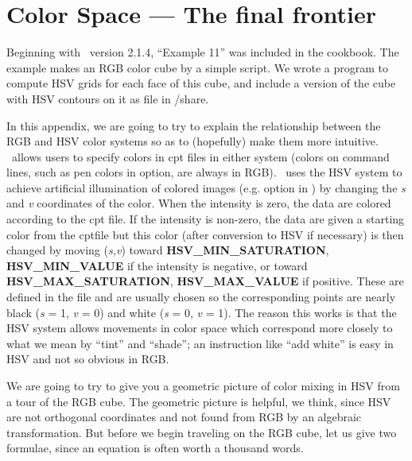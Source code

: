 %
%
\chapter{Color Space --- The final frontier}
\label{app:I}
\thispagestyle{headings}

Beginning with \GMT\ version 2.1.4, ``Example 11'' was included in
the cookbook.  The example makes an RGB color cube by a simple
 script.  We wrote a program to compute HSV grids for
each face of this cube, and include a version of the cube with
HSV contours on it as file  in /share.


In this appendix, we are going to try to explain the relationship
between the RGB and HSV color systems so as to (hopefully) make
them more intuitive.  \GMT\ allows users to specify colors in cpt
files in either system (colors on command lines, such as pen colors
in  option, are always in RGB).  \GMT\ uses the HSV system to
achieve artificial illumination of colored images (e.g. 
option in ) by changing the {\it s} and {\it v}
coordinates of the color.  When the intensity is zero, the data
are colored according to the cpt file.  If the intensity is
non-zero, the data are given a starting color from the cptfile
but this color (after conversion to HSV if necessary) is then
changed by moving ({\it s,}{\it v}) toward {\bf HSV\_MIN\_SATURATION},
{\bf HSV\_MIN\_VALUE} if the intensity is negative, or toward
{\bf HSV\_MAX\_SATURATION}, {\bf HSV\_MAX\_VALUE} if positive.  These are
defined in the  file and are usually
chosen so the corresponding points are nearly black ({\it s} = 1,
{\it v} = 0) and white ({\it s} = 0, {\it v} = 1).
The reason this works is that the HSV system allows movements in
color space which correspond more closely to what we mean by
``tint'' and ``shade''; an instruction like ``add white'' is
easy in HSV and not so obvious in RGB.

We are going to try to give you a geometric picture of color
mixing in HSV from a tour of the RGB cube.  The geometric
picture is helpful, we think, since HSV are not orthogonal
coordinates and not found from RGB by an algebraic transformation.
But before we begin traveling on the RGB cube, let us give two
formulae, since an equation is often worth a thousand words. \\

